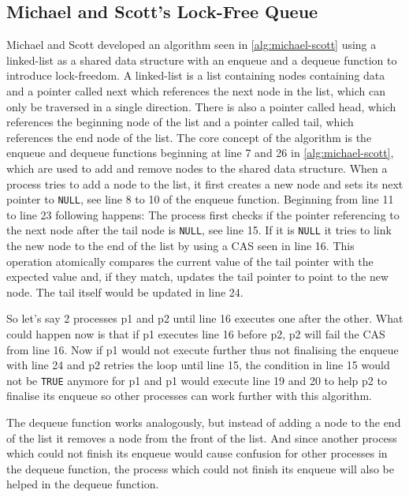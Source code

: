 \subsection{Michael and Scott's Lock-Free Queue}\label{subsec:michael-scott}

Michael and Scott developed an algorithm seen in \cref{alg:michael-scott} using a linked-list as a shared data structure with an enqueue and a dequeue function to introduce lock-freedom. A linked-list is a list containing nodes containing data and a pointer called next which references the next node in the list, which can only be traversed in a single direction. There is also a pointer called head, which references the beginning node of the list and a pointer called tail, which references the end node of the list. The core concept of the algorithm is the enqueue and dequeue functions beginning at line 7 and 26 in \cref{alg:michael-scott}, which are used to add and remove nodes to the shared data structure. When a process tries to add a node to the list, it first creates a new node and sets its next pointer to \texttt{NULL}, see line 8 to 10 of the enqueue function. Beginning from line 11 to line 23 following happens: The process first checks if the pointer referencing to the next node after the tail node is \texttt{NULL}, see line 15. If it is \texttt{NULL} it tries to link the new node to the end of the list by using a \ac{CAS} seen in line 16. This operation atomically compares the current value of the tail pointer with the expected value and, if they match, updates the tail pointer to point to the new node. The tail itself would be updated in line 24.  \cite{MichaelScottQueue}

So let's say 2 processes p1 and p2 until line 16 executes one after the other. What could happen now is that if p1 executes line 16 before p2, p2 will fail the \ac{CAS} from line 16. Now if p1 would not execute further thus not finalising the enqueue with line 24 and p2 retries the loop until line 15, the condition in line 15 would not be \texttt{TRUE} anymore for p1 and p1 would execute line 19 and 20 to help p2 to finalise its enqueue so other processes can work further with this algorithm. \cite{MichaelScottQueue}

The dequeue function works analogously, but instead of adding a node to the end of the list it removes a node from the front of the list. And since another process which could not finish its enqueue would cause confusion for other processes in the dequeue function, the process which could not finish its enqueue will also be helped in the dequeue function. \cite{MichaelScottQueue}

